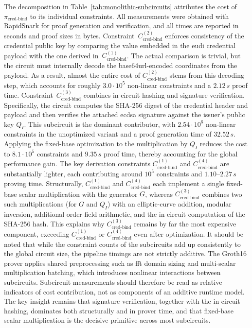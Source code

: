 The decomposition in Table~\ref{tab:monolithic-subcircuits} attributes the cost of $\pi_{\text{cred-bind}}$ to its individual constraints. All measurements were obtained with RapidSnark for proof generation and verification, and all times are reported in seconds and proof sizes in bytes. Constraint~$C_{\text{cred-bind}}^{(2)}$ enforces consistency of the credential public key by comparing the value embedded in the \acrshort{eudi} credential payload with the one derived in~$C_{\text{cred-bind}}^{(1)}$. The actual comparison is trivial, but the circuit must internally decode the base64url-encoded coordinates from the payload. As a result, almost the entire cost of $C_{\text{cred-bind}}^{(2)}$ stems from this decoding step, which accounts for roughly $3.0 \cdot 10^5$ non-linear constraints and a $2.12\,s$ proof time. Constraint~$C_{\text{cred-bind}}^{(3)}$ combines in-circuit hashing and signature verification. Specifically, the circuit computes the SHA-256 digest of the credential header and payload and then verifies the attached \acrshort{ecdsa} signature against the issuer’s public key $Q_I$. This subcircuit is the dominant contributor, with $2.54 \cdot 10^6$ non-linear constraints in the unoptimized variant and a proof generation time of $32.52\,s$. Applying the fixed-base optimization to the multiplication by $Q_I$ reduces the cost to $8.1 \cdot 10^5$ constraints and $9.35\,s$ proof time, thereby accounting for the global performance gain. The key derivation constraints $C_{\text{cred-bind}}^{(1)}$ and $C_{\text{cred-bind}}^{(4)}$ are substantially lighter, each contributing around $10^5$ constraints and $1.10$--$2.27\,s$ proving time. Structurally, $C_{\text{cred-bind}}^{(1)}$ and $C_{\text{cred-bind}}^{(4)}$ each implement a single fixed-base scalar multiplication with the generator $G$, whereas $C_{\text{cred-bind}}^{(3)}$ combines two such multiplications (for $G$ and $Q_I$) with an elliptic-curve addition, modular inversion, additional order-field arithmetic, and the in-circuit computation of the SHA-256 hash. This explains why $C_{\text{cred-bind}}^{(3)}$ remains by far the most expensive component, exceeding $C_{\text{cred-bind}}^{(1)}$ or $C_{\text{cred-bind}}^{(4)}$ even after optimization.
It should be noted that while the constraint counts of the subcircuits add up consistently to the global circuit size, the pipeline timings are not strictly additive. The Groth16 prover applies shared preprocessing such as \acrshort{fft} domain sizing and multi-scalar multiplication batching, which introduces nonlinear interactions between subcircuits. Subcircuit measurements should therefore be read as relative indicators of cost contribution, not as components of an additive runtime model. The key insight remains that signature verification, together with the in-circuit hashing, dominates both structurally and in prover time, and that fixed-base scalar multiplication is the decisive primitive across most subcircuits.

